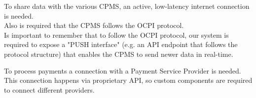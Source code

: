 \begin{enumerate}
	To share data with the various CPMS, an active, low-latency internet connection is needed.\\
   Also is required that the CPMS follows the OCPI protocol.\\
   Is important to remember that to follow the OCPI protocol, our system is required to expose a "PUSH interface" (e.g. an API endpoint that follows the protocol structure) that enables the CPMS to send newer data in real-time.
   
    To process payments a connection with a Payment Service Provider is needed. This connection happens via proprietary API, so custom components are required to connect different providers.
\end{enumerate}


























